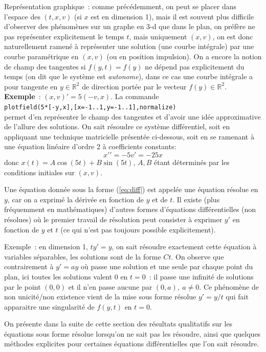 \documentclass[a4paper,11pt]{article}
\newcommand{\R}{{\mathbb{R}}}
\begin{document}
\begin{giacjshere}
Repr\'esentation graphique~: comme pr\'ec\'edemment,
on peut se placer dans l'espace
des $(t,x,v)$ (si $x$ est en dimension 1), mais il est souvent
plus difficile d'observer des ph\'enom\`enes sur un graphe
en 3-d que dans le plan, on pr\'ef\`ere ne pas repr\'esenter explicitement le
temps $t$, mais uniquement $(x,v)$, on est donc naturellement
ramen\'e \`a repr\'esenter une solution (une courbe int\'egrale)
par une courbe param\'etrique en $(x,v)$ (ou en position
impulsion). On a encore la notion de champ des tangentes
si $f(y,t)=f(y)$ ne d\'epend pas explicitement du temps
(on dit que le syst\`eme est {\em autonome}), dans ce
cas une courbe int\'egrale a pour tangente en $y\in \R^2$ 
de direction port\'ee par le vecteur $f(y) \in \R^2$.\\
{\bf Exemple}~: $(x,v)'=5(-v,x)$. La commande \\
\verb|plotfield(5*[-y,x],[x=-1..1,y=-1..1],normalize)|\\
permet d'en repr\'esenter le champ des tangentes
et d'avoir une id\'ee approximative de l'allure des solutions.
On sait r\'esoudre ce syst\`eme diff\'erentiel, soit en appliquant
une technique matricielle pr\'esent\'ee ci-dessous, 
soit en se ramenant \`a une \'equation
lin\'eaire d'ordre 2 \`a coefficients constants:
$$ x'{'}=-5v'=-25x$$
donc $x(t)=A\cos(5t)+B\sin(5t)$, $A, B$ \'etant d\'etermin\'es
par les conditions initiales sur $(x,v)$.

Une \'equation donn\'ee sous la forme (\ref{eq:diff}) 
est appel\'ee une \'equation r\'esolue en $y$,
car on a exprim\'e la d\'eriv\'ee en fonction de $y$ et de $t$. Il
existe (plus fr\'equemment en math\'ematiques) d'autres formes d'\'equations
diff\'erentielles (non r\'esolues) o\`u le premier travail de r\'esolution
peut consister \`a exprimer
$y'$ en fonction de $y$ et $t$ (ce qui n'est pas toujours possible 
explicitement).

Exemple~: en dimension 1, $ty'=y$, on sait r\'esoudre exactement
cette \'equation \`a variables s\'eparables, les solutions sont de la 
forme $Ct$. On observe que contrairement \`a $y'=ay$
o\`u passe une solution et une seule par chaque point du plan,
ici toutes les solutions valent 0 en $t=0$~: il passe une
infinit\'e de solutions par le point $(0,0)$ et il n'en passe aucune
par $(0,a), \ a \neq 0$. Ce ph\'enom\`ene de non unicit\'e/non
existence vient de la mise sous forme r\'esolue $y'=y/t$ qui
fait apparaitre une singularit\'e de $f(y,t)$ en $t=0$.

On pr\'esente dans la suite de cette section 
des r\'esultats qualitatifs sur les \'equations sous forme r\'esolue
lorsqu'on ne sait pas les r\'esoudre, ainsi que 
quelques m\'ethodes explicites
pour certaines \'equations diff\'erentielles que l'on sait
r\'esoudre.


\end{giacjshere}
\end{document}
